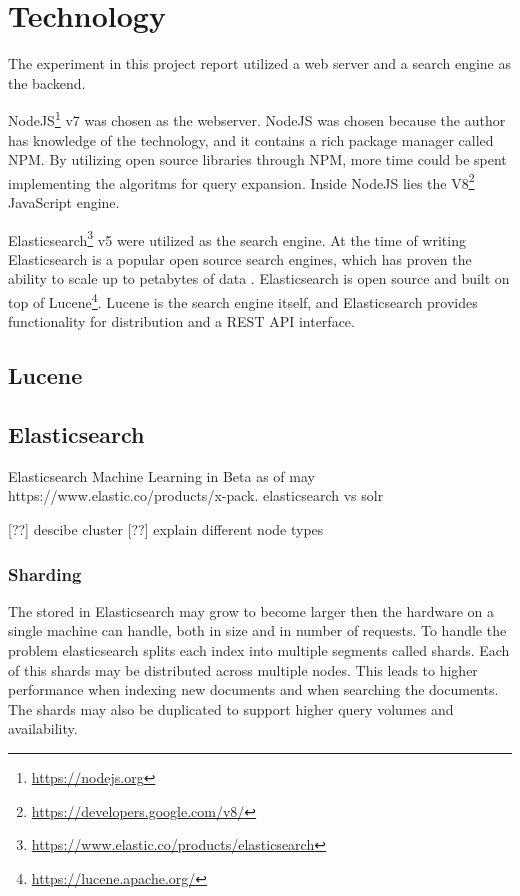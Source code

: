 \section{Technology}
The experiment in this project report utilized a web server and a search engine as the backend.

NodeJS\footnote{\url{https://nodejs.org}} v7 was chosen as the webserver.
NodeJS was chosen because the author has knowledge of the technology,
and it contains a rich package manager called NPM.
By utilizing open source libraries through NPM, more time could be spent implementing the algoritms for query expansion.
Inside NodeJS lies the V8\footnote{\url{https://developers.google.com/v8/}} JavaScript engine.

Elasticsearch\footnote{\url{https://www.elastic.co/products/elasticsearch}} v5 were utilized as the search engine.
At the time of writing Elasticsearch is a popular open source search engines, which has proven the ability to scale up to petabytes of data \cite{elasticsearch-scale}.
Elasticsearch is open source and built on top of Lucene\footnote{\url{https://lucene.apache.org/}}.
Lucene is the search engine itself,
and Elasticsearch provides functionality for distribution and a REST API interface.

\subsection{Lucene}

\subsection{Elasticsearch}
Elasticsearch Machine Learning in Beta as of may https://www.elastic.co/products/x-pack.
elasticsearch vs solr

[??] descibe cluster
[??] explain different node types

\subsubsection{Sharding}
The stored in Elasticsearch may grow to become larger then the hardware on a single machine can handle,
both in size and in number of requests.
To handle the problem elasticsearch splits each index into multiple segments called shards.
Each of this shards may be distributed across multiple nodes.
This leads to higher performance when indexing new documents and when searching the documents.
The shards may also be duplicated to support higher query volumes and availability.


